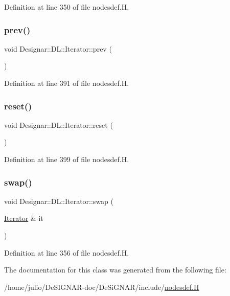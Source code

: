 Definition at line 350 of file nodesdef.\+H.

\mbox{\label{class_designar_1_1_d_l_1_1_iterator_a8550a08d7c7645c8ec41ba209ee21893}} 
\subsubsection{\texorpdfstring{prev()}{prev()}}
{\footnotesize\ttfamily void Designar\+::\+D\+L\+::\+Iterator\+::prev (\begin{DoxyParamCaption}{ }\end{DoxyParamCaption})\hspace{0.3cm}{\ttfamily [inline]}}



Definition at line 391 of file nodesdef.\+H.

\mbox{\label{class_designar_1_1_d_l_1_1_iterator_a7708230beaa8a47d664878d37c11bbd3}} 
\subsubsection{\texorpdfstring{reset()}{reset()}}
{\footnotesize\ttfamily void Designar\+::\+D\+L\+::\+Iterator\+::reset (\begin{DoxyParamCaption}{ }\end{DoxyParamCaption})\hspace{0.3cm}{\ttfamily [inline]}}



Definition at line 399 of file nodesdef.\+H.

\mbox{\label{class_designar_1_1_d_l_1_1_iterator_af8bba1d661f8d6300664481d7c6fd976}} 
\subsubsection{\texorpdfstring{swap()}{swap()}}
{\footnotesize\ttfamily void Designar\+::\+D\+L\+::\+Iterator\+::swap (\begin{DoxyParamCaption}\item[{\hyperlink{class_designar_1_1_d_l_1_1_iterator}{Iterator} \&}]{it }\end{DoxyParamCaption})\hspace{0.3cm}{\ttfamily [inline]}}



Definition at line 356 of file nodesdef.\+H.



The documentation for this class was generated from the following file\+:\begin{DoxyCompactItemize}
\item 
/home/julio/\+De\+S\+I\+G\+N\+A\+R-\/doc/\+De\+Si\+G\+N\+A\+R/include/\hyperlink{nodesdef_8_h}{nodesdef.\+H}\end{DoxyCompactItemize}
